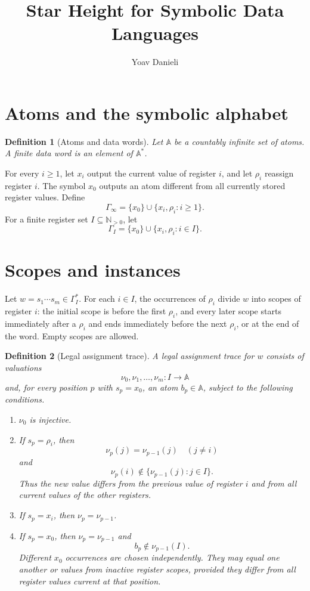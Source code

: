 \documentclass[11pt]{article}
\title{Star Height for Symbolic Data Languages}
\author{Yoav Danieli}
\date{}
\newtheorem{definition}{Definition}
\begin{document}
\maketitle


\section{Atoms and the symbolic alphabet}

\begin{definition}[Atoms and data words]
Let $\mathbb A$ be a countably infinite set of \emph{atoms}. A finite data word
is an element of $\mathbb A^*$.
\end{definition}

For every $i\geq1$, let $x_i$ output the current value of register $i$, and let
$\rho_i$ reassign register $i$. The symbol $x_0$ outputs an atom different from
all currently stored register values. Define
\[
 \Gamma_\infty=\{x_0\}\cup\{x_i,\rho_i:i\geq1\}.
\]
For a finite register set $I\subseteq\mathbb N_{>0}$, let
\[
 \Gamma_I=\{x_0\}\cup\{x_i,\rho_i:i\in I\}.
\]

\section{Scopes and instances}

Let $w=s_1\cdots s_m\in\Gamma_I^*$. For each $i\in I$, the occurrences of
$\rho_i$ divide $w$ into scopes of register $i$: the initial scope is before
the first $\rho_i$, and every later scope starts immediately after a
$\rho_i$ and ends immediately before the next $\rho_i$, or at the end of the
word. Empty scopes are allowed.

\begin{definition}[Legal assignment trace]
A legal assignment trace for $w$ consists of valuations
\[
 \nu_0,\nu_1,\ldots,\nu_m:I\to\mathbb A
\]
and, for every position $p$ with $s_p=x_0$, an atom $b_p\in\mathbb A$, subject
to the following conditions.

\begin{enumerate}[label=(\roman*)]
\item $\nu_0$ is injective.
\item If $s_p=\rho_i$, then
\[
 \nu_p(j)=\nu_{p-1}(j)\quad(j\neq i)
\]
and
\[
 \nu_p(i)\notin\{\nu_{p-1}(j):j\in I\}.
\]
Thus the new value differs from the previous value of register $i$ and from
all current values of the other registers.
\item If $s_p=x_i$, then $\nu_p=\nu_{p-1}$.
\item If $s_p=x_0$, then $\nu_p=\nu_{p-1}$ and
\[
 b_p\notin\nu_{p-1}(I).
\]
Different $x_0$ occurrences are chosen independently. They may equal one
another or values from inactive register scopes, provided they differ from all
register values current at that position.
\end{enumerate}
\end{definition}
\end{document}
